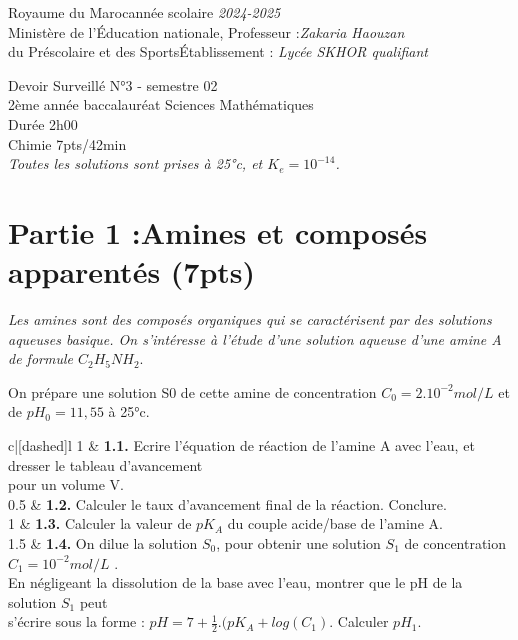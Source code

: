 \documentclass[12pt]{article}
\newcommand\headerMe[2]{\noindent{}#1\hfill#2}
\begin{document}
\headerMe{Royaume du Maroc}{année scolaire \emph{2024-2025}}\\
\headerMe{Ministère de l'Éducation nationale, }{  Professeur :\emph{Zakaria Haouzan}}\\
\headerMe{du Préscolaire et des Sports}{Établissement : \emph{Lycée SKHOR qualifiant}}\\

\begin{center}
Devoir Surveillé  N°3 - semestre 02 \\
    2ème année baccalauréat Sciences Mathématiques\\
Durée 2h00
\\
    \vspace{.2cm}
\hrulefill
\Large{Chimie 7pts/42min}
\hrulefill\\

	\emph{Toutes les solutions sont prises à 25°c, et $K_e=10^{-14}$. }
\end{center}

 \section*{Partie 1 :Amines et composés apparentés \dotfill(7pts) }

 \emph{Les amines sont des composés organiques qui se caractérisent par des solutions
aqueuses basique. On s’intéresse à l’étude d’une solution aqueuse d’une amine A de
formule $C_2H_5NH_2.$ }

On prépare une solution S0 de cette amine de concentration $C_0=2.10^{-2} mol/L$ et de $pH_0=11,55$ à 25°c.

\begin{tblr}{c|[dashed]l}
	1  & {\textbf{1.1. }Ecrire l’équation de réaction de l’amine A avec l’eau, et dresser le tableau
	d’avancement\\pour un volume V.} \\
	0.5  & \textbf{1.2. }Calculer le taux d’avancement final de la réaction. Conclure.\\
	1  & \textbf{1.3. }Calculer la valeur de $pK_A$ du couple acide/base de l’amine A. \\
	1.5  & {\textbf{1.4. }On dilue la solution $S_0$, pour obtenir une solution $S_1$ de concentration
	$C_1=10^{-2} mol/L$ . \\En négligeant la dissolution de la base avec l’eau, montrer que le
	pH de la solution $S_1$ peut\\ s’écrire sous la forme : $pH = 7 + \frac{1}{2}.(pK_A + log(C_1)$.
Calculer $pH_1$. } \\
\end{tblr}
\end{document}
